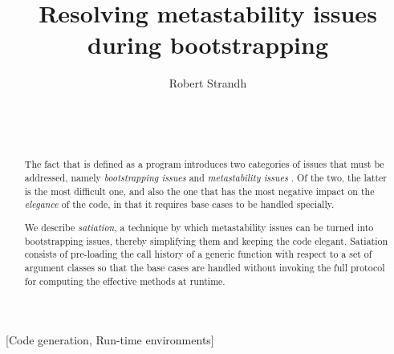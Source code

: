 \documentclass{acm_proc_article-sp}
\def\inputtex#1{}
\begin{document}
\title{Resolving metastability issues during bootstrapping}
\author{\alignauthor
Robert Strandh\\
\\
\\
\\
}


\maketitle

\begin{abstract}
The fact that \clos{} is defined as a \clos{} program introduces two
categories of issues that must be addressed, namely
\emph{bootstrapping issues} and \emph{metastability issues}
\cite{Kiczales:1991:AMP:574212}.  Of the two, the latter is the most
difficult one, and also the one that has the most negative impact on
the \emph{elegance} of the code, in that it requires base cases to be
handled specially.

We describe \emph{satiation}, a technique by which metastability
issues can be turned into bootstrapping issues, thereby simplifying
them and keeping the code elegant.  Satiation consists of pre-loading
the call history of a generic function with respect to a set of
argument classes so that the base cases are handled without invoking
the full protocol for computing the effective methods at runtime.
\end{abstract}

[Code generation, Run-time environments]

\inputtex{sec-introduction.tex}
\inputtex{sec-previous.tex}
\inputtex{sec-our-method.tex}
\inputtex{sec-conclusions.tex}



\end{document}
